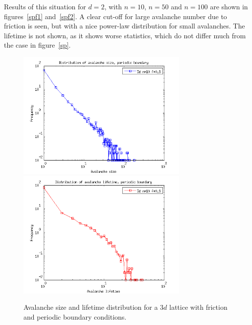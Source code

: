 Results of this situation for $d=2$, with $n=10$, $n=50$ and $n=100$ are shown in figures~\ref{spf1} and~\ref{spf2}. A clear cut-off for large avalanche number due to friction is seen, but with a nice power-law distribution for small avalanches. The lifetime is not shown, as it shows worse statistics, which do not differ much from the case in figure~\ref{sp}.



\begin{figure}
\begin{center}
\includegraphics[width=0.75\textwidth]{results/3spf.png} \\
\includegraphics[width=0.75\textwidth]{results/3tpf.png} \\
\caption{Avalanche size and lifetime distribution for a $3d$ lattice with friction and periodic boundary conditions. }
\label{dspf3}
\end{center}
\end{figure}

